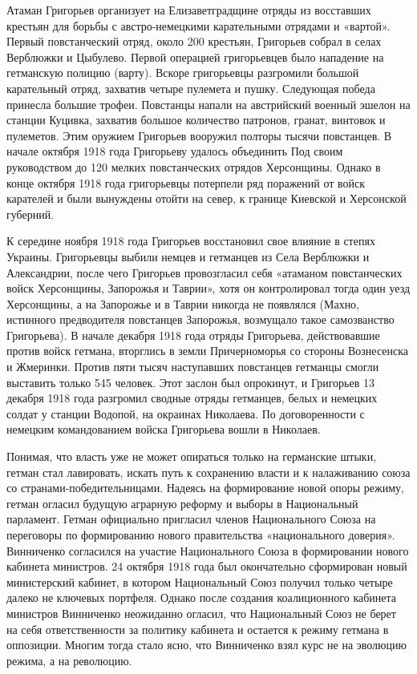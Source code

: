 \begin{itemize}
Атаман Григорьев организует на Елизаветградщине отряды из восставших крестьян
для борьбы с австро-немецкими карательными отрядами и «вартой». Первый
повстанческий отряд, около 200 крестьян, Григорьев собрал в селах Верблюжки и
Цыбулево. Первой операцией григорьевцев было нападение на гетманскую полицию
(варту). Вскоре григорьевцы разгромили большой карательный отряд, захватив
четыре пулемета и пушку. Следующая победа принесла большие трофеи. Повстанцы
напали на австрийский военный эшелон на станции Куцивка, захватив большое
количество патронов, гранат, винтовок и пулеметов. Этим оружием Григорьев
вооружил полторы тысячи повстанцев. В начале октября 1918 года Григорьеву
удалось объединить Под своим руководством до 120 мелких повстанческих отрядов
Херсонщины. Однако в конце октября 1918 года григорьевцы потерпели ряд
поражений от войск карателей и были вынуждены отойти на север, к границе
Киевской и Херсонской губерний.

К середине ноября 1918 года Григорьев восстановил свое влияние в степях
Украины. Григорьевцы выбили немцев и гетманцев из Села Верблюжки и Александрии,
после чего Григорьев провозгласил себя «атаманом повстанческих войск
Херсонщины, Запорожья и Таврии», хотя он контролировал тогда один уезд
Херсонщины, а на Запорожье и в Таврии никогда не появлялся (Махно, истинного
предводителя повстанцев Запорожья, возмущало такое самозванство Григорьева). В
начале декабря 1918 года отряды Григорьева, действовавшие против войск гетмана,
вторглись в земли Причерноморья со стороны Вознесенска и Жмеринки. Против пяти
тысяч наступавших повстанцев гетманцы смогли выставить только 545 человек. Этот
заслон был опрокинут, и Григорьев 13 декабря 1918 года разгромил сводные отряды
гетманцев, белых и немецких солдат у станции Водопой, на окраинах Николаева. По
договоренности с немецким командованием войска Григорьева вошли в Николаев.


Понимая, что власть уже не может опираться только на германские штыки, гетман
стал лавировать, искать путь к сохранению власти и к налаживанию союза со
странами-победительницами. Надеясь на формирование новой опоры режиму, гетман
огласил будущую аграрную реформу и выборы в Национальный парламент. Гетман
официально пригласил членов Национального Союза на переговоры по формированию
нового правительства «национального доверия». Винниченко согласился на участие
Национального Союза в формировании нового кабинета министров. 24 октября 1918
года был окончательно сформирован новый министерский кабинет, в котором
Национальный Союз получил только четыре далеко не ключевых портфеля. Однако
после создания коалиционного кабинета министров Винниченко неожиданно огласил,
что Национальный Союз не берет на себя ответственности за политику кабинета и
остается к режиму гетмана в оппозиции. Многим тогда стало ясно, что Винниченко
взял курс не на эволюцию режима, а на революцию.


\end{itemize}
